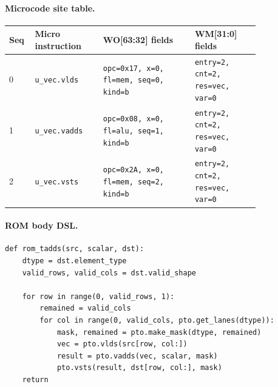 \paragraph{Microcode site table.}
{\scriptsize
\begin{longtable}{@{}R{0.055\linewidth}L{0.23\linewidth}L{0.31\linewidth}L{0.22\linewidth}@{}}
\toprule
Seq & Micro instruction & WO[63:32] fields & WM[31:0] fields \\
 & \texttt{u\_vec.vlds} & \texttt{opc=0x17, x=0, fl=mem, seq=0, kind=b} & \texttt{entry=2, cnt=2, res=vec, var=0} \\
1 & \texttt{u\_vec.vadds} & \texttt{opc=0x08, x=0, fl=alu, seq=1, kind=b} & \texttt{entry=2, cnt=2, res=vec, var=0} \\
2 & \texttt{u\_vec.vsts} & \texttt{opc=0x2A, x=0, fl=mem, seq=2, kind=b} & \texttt{entry=2, cnt=2, res=vec, var=0} \\
\bottomrule
\end{longtable}
}
\paragraph{ROM body DSL.}
\begin{lstlisting}[style=ptocode]
def rom_tadds(src, scalar, dst):
    dtype = dst.element_type
    valid_rows, valid_cols = dst.valid_shape

    for row in range(0, valid_rows, 1):
        remained = valid_cols
        for col in range(0, valid_cols, pto.get_lanes(dtype)):
            mask, remained = pto.make_mask(dtype, remained)
            vec = pto.vlds(src[row, col:])
            result = pto.vadds(vec, scalar, mask)
            pto.vsts(result, dst[row, col:], mask)
    return
\end{lstlisting}
\Needspace{0.34\textheight}
